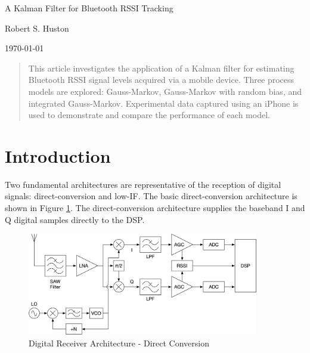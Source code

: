 \documentclass[12pt]{article}
\begin{document}
\setlength{\parskip}{12pt}      %



\begin{titlepage}
    \begin{center}
        \vspace*{\fill}
        
        \huge
        A Kalman Filter for Bluetooth RSSI Tracking
        
        \vspace{36pt}

        \large
        Robert S. Huston

        \vspace{36pt}
        
        \today
        
        \vfill
    \end{center}
\end{titlepage}



\begin{abstract}
This article investigates the application of a Kalman filter for estimating Bluetooth
RSSI signal levels acquired via a mobile device. Three process models are explored:
Gauss-Markov, Gauss-Markov with random bias, and integrated Gauss-Markov. Experimental
data captured using an iPhone is used to demonstrate and compare the performance of each
model.
\end{abstract}



\clearpage
\tableofcontents



%
%

\clearpage
\section{Introduction}

Two fundamental architectures are representative of the reception of digital signals:
direct-conversion and low-IF. The basic direct-conversion architecture is shown in
Figure \ref{fig:rx-arch-direct}. The direct-conversion architecture supplies the baseband
I and Q digital samples directly to the DSP.

\begin{figure}[ht]
    \centering
    \includegraphics[width=0.9\textwidth]{RX-Arch-Direct.png}
    \caption{Digital Receiver Architecture - Direct Conversion}
    \label{fig:rx-arch-direct}
\end{figure}
\end{document}

